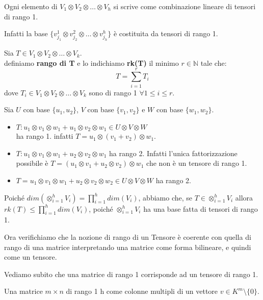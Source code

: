 \documentclass[../main.tex]{subfiles}
\begin{document}
Ogni elemento di $V_1 \otimes V_2 \otimes \ldots \otimes V_h$ si scrive come combinazione lineare di tensori di rango 1.

Infatti la base $\{v_{j_1}^1 \otimes v_{j_2}^2 \otimes \ldots \otimes v_{j_h}^h\}$ è costituita da tensori di rango 1.
\begin{definition}
    Sia $T \in V_1 \otimes V_2 \otimes \ldots \otimes V_k$.\\
    definiamo \textbf{rango di T} e lo indichiamo \textbf{rk(T)} il minimo $r \in \mathbb{N}$ tale che:
    \begin{equation*}
        T = \sum_{i=1}^{r}T_i
    \end{equation*}
    dove $T_i \in V_1 \otimes V_2 \otimes \ldots \otimes V_k$ sono di rango 1 $\forall 1 \leq i \leq r$.
\end{definition}

\begin{example}
    Sia $U$ con base $\{u_1, u_2\}$, $V$ con base $\{v_1, v_2\}$ e $W$ con base $\{w_1, w_2\}$.
    \begin{itemize}
        \item $T: u_1 \otimes v_1 \otimes w_1 + u_1 \otimes v_2 \otimes w_1  \in U \otimes V  \otimes W$\\
              ha rango 1. infatti $T = u_1 \otimes (v_1 + v_2 )\otimes w_1$.
        \item $T: u_1 \otimes v_1 \otimes w_1 + u_2 \otimes v_2 \otimes w_1$ ha rango 2.
              Infatti l'unica fattorizzazione possibile è $T = (u_1 \otimes v_1  + u_2 \otimes v_2) \otimes w_1$ che non è un tensore di rango 1.
        \item $T = u_1 \otimes v_1 \otimes w_1 + u_2 \otimes v_2 \otimes w_2 \in U \otimes V \otimes W $ ha rango 2.
    \end{itemize}
\end{example}

Poiché $dim(\otimes_{i=1}^{h} V_i) = \prod_{i=1}^{h} dim(V_i)$, abbiamo che, se $T \in \otimes_{i=1}^{h} V_i$ allora $rk(T) \leq \prod_{i=1}^{h} dim(V_i)$, poiché $\otimes_{i=1}^{h} V_i$ ha una base fatta di tensori di rango 1.

Ora verifichiamo che la nozione di rango di un Tensore è coerente con quella di rango di una matrice interpretando una matrice come forma bilineare, e quindi come un tensore.

Vediamo subito che una matrice di rango 1 corrisponde ad un tensore di rango 1.

Una matrice $m \times n$ di rango 1 h come colonne multipli di un vettore $v \in K^m \setminus \{0\}$.
\end{document}
